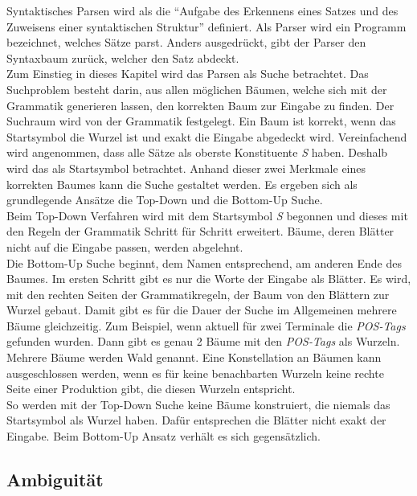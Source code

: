 Syntaktisches Parsen wird als die ``Aufgabe des Erkennens eines Satzes und des Zuweisens einer syntaktischen Struktur''\cite[S. 461]{nlpGrundlagen} definiert.
Als Parser wird ein Programm bezeichnet, welches Sätze parst. Anders ausgedrückt, gibt der Parser den Syntaxbaum zurück, welcher den Satz abdeckt. \\
Zum Einstieg in dieses Kapitel wird das Parsen als Suche betrachtet. Das Suchproblem besteht darin, aus allen möglichen Bäumen, welche sich mit der Grammatik generieren lassen, den korrekten Baum zur Eingabe zu finden. Der Suchraum wird von der Grammatik festgelegt. Ein Baum ist korrekt, wenn das Startsymbol die Wurzel ist und exakt die Eingabe abgedeckt wird. Vereinfachend wird angenommen, dass alle Sätze als oberste Konstituente \textit{S} haben. Deshalb wird das als Startsymbol betrachtet. Anhand dieser zwei Merkmale eines korrekten Baumes kann die Suche gestaltet werden. Es ergeben sich als grundlegende Ansätze die Top-Down und die Bottom-Up Suche. \\
Beim Top-Down Verfahren wird mit dem Startsymbol \textit{S} begonnen und dieses mit den Regeln der Grammatik Schritt für Schritt erweitert. Bäume, deren Blätter nicht auf die Eingabe passen, werden abgelehnt. \\
Die Bottom-Up Suche beginnt, dem Namen entsprechend, am anderen Ende des Baumes. Im ersten Schritt gibt es nur die Worte der Eingabe als Blätter. Es wird, mit den rechten Seiten der Grammatikregeln, der Baum von den Blättern zur Wurzel gebaut. Damit gibt es für die Dauer der Suche im Allgemeinen mehrere Bäume gleichzeitig. Zum Beispiel, wenn aktuell für zwei Terminale die \textit{POS-Tags} gefunden wurden. Dann gibt es genau 2 Bäume mit den \textit{POS-Tags} als Wurzeln. Mehrere Bäume werden Wald genannt. %
Eine Konstellation an Bäumen kann ausgeschlossen werden, wenn es für keine benachbarten Wurzeln keine rechte Seite einer Produktion gibt, die diesen Wurzeln entspricht. \\
So werden mit der Top-Down Suche keine Bäume konstruiert, die niemals das Startsymbol als Wurzel haben. Dafür entsprechen die Blätter nicht exakt der Eingabe. Beim Bottom-Up Ansatz verhält es sich gegensätzlich. %
\subsection{Ambiguität}

